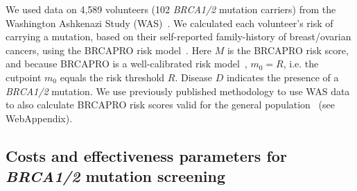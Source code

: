 \documentclass[AMA,STIX1COL]{WileyNJD-v2}
\begin{document}
%

We used data on 4,589 volunteers (102 \textit{BRCA1/2} mutation carriers) from the Washington Ashkenazi Study (WAS)~\citep{STRUEWING1997}.  We calculated each volunteer's risk of carrying a mutation, based on their self-reported family-history of breast/ovarian cancers, using the BRCAPRO risk model~\citep{Parmigiani1998}.  Here $M$ is the BRCAPRO risk score, and because BRCAPRO is a well-calibrated risk model~\citep{Best2019}, $m_0=R$, i.e. the cutpoint $m_0$ equals the risk threshold $R$. Disease $D$ indicates the presence of a \textit{BRCA1/2} mutation.  We use previously published methodology to use WAS data to also calculate BRCAPRO risk scores valid for the general population~\citep{Best2019} (see WebAppendix).


\subsection{Costs and effectiveness parameters for \textit{BRCA1/2} mutation screening}
\label{sec:CostsEffBRCA}
\end{document}
